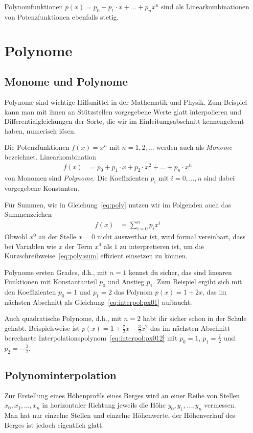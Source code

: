 \documentclass{article}
\begin{document}
Polynomfunktionen $p(x) = p_0+p_1\cdot x + \ldots + p_n x^n$ sind als
Linearkombinationen von Potenzfunktionen ebenfalls stetig.

\section{Polynome}
\subsection{Monome und Polynome}
\label{sec:poly}
Polynome sind wichtige Hilfsmittel in der Mathematik und Physik. Zum
Beispiel kann man mit ihnen an Stützstellen vorgegebene Werte glatt
interpolieren und Differentialgleichungen der Sorte, die wir im
Einleitungsabschnitt kennengelernt haben, numerisch lösen.

Die Potenzfunktionen $f(x)=x^n$ mit $n=1,2,\ldots$ werden auch als
\emph{Monome} bezeichnet. Linearkombination
\begin{align}
  f(x) &= p_0 + p_1\cdot x + p_2\cdot x^2 + \ldots + p_n\cdot x^n
         \label{eq:poly}
\end{align}
von Monomen sind \emph{Polynome}. Die Koeffizienten $p_i$ mit $i=0,\ldots,n$ sind dabei vorgegebene Konstanten.

Für Summen, wie in Gleichung~\eqref{eq:poly} nutzen wir im Folgenden auch das Summenzeichen
\begin{align}
  f(x) &= \sum_{i=0}^n p_i x^i
         \label{eq:poly:sum}
\end{align}
Obwohl $x^0$ an der Stelle $x=0$ nicht auswertbar ist, wird formal
vereinbart, dass bei Variablen wie $x$ der Term $x^0$ als $1$ zu
interpretieren ist, um die Kurzschreibweise~\eqref{eq:poly:sum}
effizient einsetzen zu können.

Polynome ersten Grades, d.h., mit $n=1$ kennst du sicher, das sind
linearen Funktionen mit Konstantanteil $p_0$ und Anstieg $p_1$.  Zum
Beispiel ergibt sich mit den Koeffizienten $p_0=1$ und $p_1=2$ das
Polynom $p(x)=1+2x$, das im nächsten Abschnitt als
Gleichung~\eqref{eq:interpol:px01} auftaucht.

Auch quadratische Polynome, d.h., mit $n=2$ habt ihr sicher schon in
der Schule gehabt.  Beispielsweise ist $p(x)=1 + \frac 72x-\frac32x^2$
das im nächsten Abschnitt berechnete
Interpolationspolynom~\eqref{eq:interpol:px012} mit $p_0=1$,
$p_1=\frac72$ und $p_2=-\frac32$.
\subsection{Polynominterpolation}
\label{sec:interpol}
Zur Erstellung eines Höhenprofils eines Berges wird an einer Reihe von
Stellen $x_0,x_1,\ldots,x_n$ in horizontaler Richtung jeweils die Höhe $y_0,y_1,\ldots,y_n$
vermessen. Man hat nur einzelne Stellen und einzelne Höhenwerte, der
Höhenverlauf des Berges ist jedoch eigentlich glatt.
\end{document}
